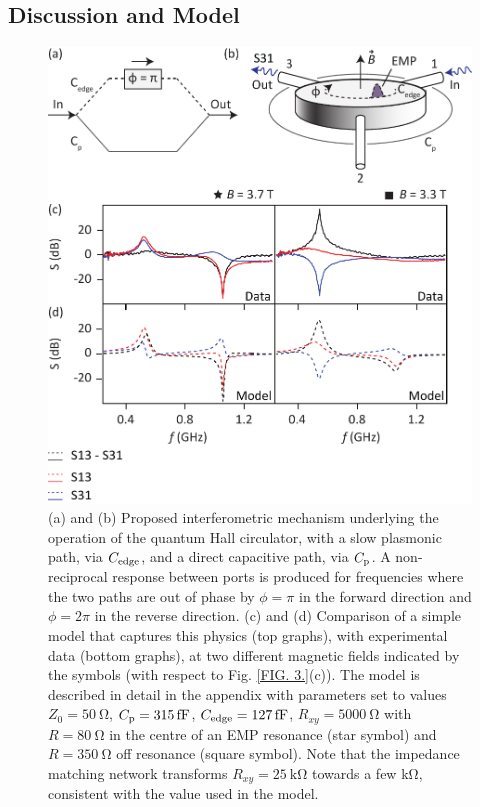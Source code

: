 \subsection{Discussion and Model}
\begin{figure}
\includegraphics[width=0.7\columnwidth]{fig4_QH}
\caption[Comparison of data and model]{\label{FIG. 4.}
(a) and (b) Proposed interferometric mechanism underlying the operation of the quantum Hall circulator, with a slow plasmonic path, via $C_{\rm edge}$, and a direct capacitive path, via $C_{\rm p}$. A non-reciprocal response between ports is produced for frequencies where the two paths are out of phase by $\phi = \pi$ in the forward direction and $\phi = 2\pi$ in the reverse direction.
(c) and (d) Comparison of a simple model that captures this physics (top graphs), with experimental data (bottom graphs), at two different magnetic fields indicated by the symbols (with respect to Fig. \ref{FIG. 3.}(c)). The model is described in detail in the appendix with parameters set to values $Z_0 = \SI{50}{\ohm}$, $C_{\rm p} = \SI{315}{\femto\farad}$, $C_{\rm edge} = \SI{127}{\femto\farad}$, $R_{xy} = \SI{5000}{\ohm}$ with $R = \SI{80}{\ohm}$ in the centre of an EMP resonance (star symbol) and $R = \SI{350}{\ohm}$ off resonance (square symbol). Note that the impedance matching network transforms $R_{xy} = \SI{25}{\kilo\ohm}$ towards a few \si{\kilo\ohm}, consistent with the value used in the model.}
\end{figure}

